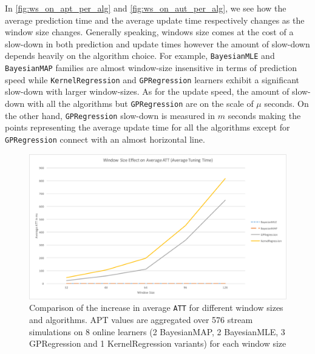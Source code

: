 In \ref{fig:ws_on_apt_per_alg} and \ref{fig:ws_on_aut_per_alg}, we see how the average prediction time and the average update time respectively changes as the window size changes. Generally speaking, windows size comes at the cost of a slow-down in both prediction and update times however the amount of slow-down depends heavily on the algorithm choice. For example, \texttt{BayesianMLE} and \texttt{BayesianMAP} families are almost window-size insensitive in terms of prediction speed while \texttt{KernelRegression} and \texttt{GPRegression} learners exhibit a significant slow-down with larger window-sizes. As for the update speed, the amount of slow-down with all the algorithms but \texttt{GPRegression} are on the scale of $\mu$ seconds. On the other hand, \texttt{GPRegression} slow-down is measured in $m$ seconds making the points representing the average update time for all the algorithms except for \texttt{GPRegression} connect with an almost horizontal line. 

\begin{figure}[htbp]
  \centering
    \includegraphics[width=\linewidth]{./Figures/ws_on_att_per_alg.pdf}
  \caption{Comparison of the increase in average \texttt{ATT} for different window sizes and algorithms. APT values are aggregated over 576 stream simulations on 8 online learners (2 BayesianMAP, 2 BayesianMLE, 3 GPRegression and 1 KernelRegression variants) for each window size}
  \label{fig:ws_on_att_per_alg}
\end{figure}

